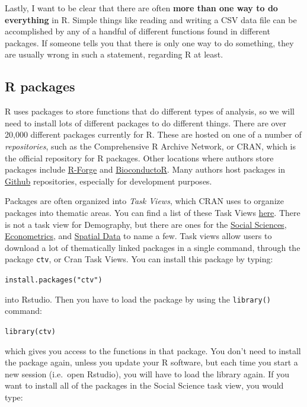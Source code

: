\documentclass[
]{article}
\begin{document}
Lastly, I want to be clear that there are often \textbf{more than one way to
do everything} in R. Simple things like reading and writing a CSV data
file can be accomplished by any of a handful of different functions
found in different packages. If someone tells you that there is only one
way to do something, they are usually wrong in such a statement,
regarding R at least.

\hypertarget{r-packages}{%
\subsection{R packages}\label{r-packages}}

R uses packages to store functions that do different types of analysis,
so we will need to install lots of different packages to do different
things. There are over 20,000 different packages currently for R. These
are hosted on one of a number of \emph{repositories}, such as the
Comprehensive R Archive Network, or CRAN, which is the official
repository for R packages. Other locations where authors store packages
include \href{\%22https://r-forge.r-project.org/\%22}{R-Forge} and
\href{\%22https://www.bioconductor.org/\%22}{BioconductoR}. Many authors host
packages in \href{\%22https://github.com\%22}{Github} repositories, especially
for development purposes.

Packages are often organized into \emph{Task Views}, which CRAN uses to
organize packages into thematic areas. You can find a list of these Task
Views \href{\%22https://cran.r-project.org/web/views/\%22}{here}. There is not
a task view for Demography, but there are ones for the \href{\%22https://cran.r-project.org/web/views/SocialSciences.html\%22}{Social
Sciences},
\href{\%22https://cran.r-project.org/web/views/Econometrics.html\%22}{Econometrics},
and \href{\%22https://cran.r-project.org/web/views/Spatial.html\%22}{Spatial
Data} to name a
few. Task views allow users to download a lot of thematically linked
packages in a single command, through the package \texttt{ctv}, or Cran Task
Views. You can install this package by typing:

\texttt{install.packages("ctv")}

into Rstudio. Then you have to load the package by using the \texttt{library()}
command:

\texttt{library(ctv)}

which gives you access to the functions in that package. You don't need
to install the package again, unless you update your R software, but
each time you start a new session (i.e.~open Rstudio), you will have to
load the library again. If you want to install all of the packages in
the Social Science task view, you would type:
\end{document}
